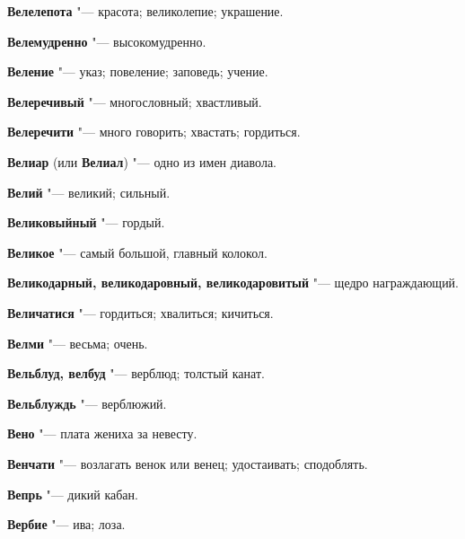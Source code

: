\begin{mymulticols}{2}
\noindent\textbf{Велелепота} "--- красота; великолепие; украшение. 




\noindent\textbf{Велемудренно} "--- высокомудренно. 




\noindent\textbf{Веление} "--- указ; повеление; заповедь; учение. 




\noindent\textbf{Велеречивый} "--- многословный; хвастливый. 




\noindent\textbf{Велеречити} "--- много говорить; хвастать; гордиться. 




\noindent\textbf{Велиар} (или \textbf{Велиал}) "--- одно из имен диавола. 




\noindent\textbf{Велий} "--- великий; сильный. 




\noindent\textbf{Великовыйный} "--- гордый. 




\noindent\textbf{Великое} "--- самый большой, главный колокол. 




\noindent\textbf{Великодарный, великодаровный, великодаровитый} "--- щедро награждающий. 




\noindent\textbf{Величатися} "--- гордиться; хвалиться; кичиться. 




\noindent\textbf{Велми} "--- весьма; очень. 




\noindent\textbf{Вельблуд, велбуд} "--- верблюд; толстый канат. 




\noindent\textbf{Вельблуждь} "--- верблюжий. 




\noindent\textbf{Вено} "--- плата жениха за невесту. 




\noindent\textbf{Венчати} "--- возлагать венок или венец; удостаивать; сподоблять. 




\noindent\textbf{Вепрь} "--- дикий кабан. 




\noindent\textbf{Вербие} "--- ива; лоза. 





\end{mymulticols}
